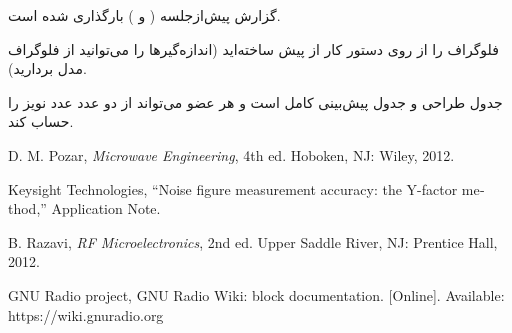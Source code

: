 \documentclass[a4paper,11pt]{article}
\begin{document}
\begin{checklist}
\item گزارش پیش‌از‌جلسه
(
و
)
بارگذاری شده است.
\item فلوگراف
را از روی دستور کار از پیش ساخته‌اید (اندازه‌گیرها را می‌توانید از فلوگراف مدل بردارید).
\item جدول طراحی و جدول پیش‌بینی کامل است و هر عضو می‌تواند از دو عدد
\dBFS{}
عدد نویز را حساب کند.
\end{checklist}

\begin{latin}\small
\begin{enumerate}[label={[\arabic*]},leftmargin=2.2em,itemsep=1pt]
\item D. M. Pozar, \textit{Microwave Engineering}, 4th ed. Hoboken, NJ: Wiley, 2012.
\item Keysight Technologies, ``Noise figure measurement accuracy: the Y-factor method,'' Application Note.
\item B. Razavi, \textit{RF Microelectronics}, 2nd ed. Upper Saddle River, NJ: Prentice Hall, 2012.
\item GNU Radio project, GNU Radio Wiki: block documentation. [Online]. Available: https://wiki.gnuradio.org
\end{enumerate}
\end{latin}
\end{document}
